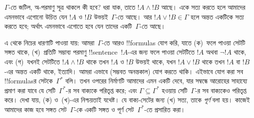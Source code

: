 \documentclass[../../../include/open-logic-section]{subfiles}
\begin{document}
$\Gamma$-তে জটিল, অ-পরমাণু সূত্র থাকলে কী হবে? ধরা যাক, তাতে $!A
\land !B$ আছে। একে সত্য করতে হলে আমাদের এমনভাবে এগোনো উচিত যেন $!A$ ও
$!B$ উভয়ই~$\Gamma$-তে আছে। আর $!A \lor !B \in \Gamma$ হলে অন্তত
একটিকে সত্য করতে হবে; অর্থাৎ এমনভাবে এগোতে হবে যেন তাদের একটি~$\Gamma$-তে
আছে।

এ থেকে নিচের ধারণাটি পাওয়া যায়: আমরা~$\Gamma$-তে আরও !!{formula}s যোগ
করি, যাতে (ক)~ফলে পাওয়া সেটটি সঙ্গত থাকে, (খ)~প্রতিটি সম্ভাব্য পরমাণু
!!{sentence}~$!A$-এর জন্য ফলে পাওয়া সেটটিতে $!A$ অথবা $\lnot !A$
থাকে, এবং (গ)~যখনই সেটটিতে $!A \land !B$ থাকে তখন $!A$ ও $!B$ উভয়ই
থাকে, যখন $!A \lor !B$ থাকে তখন $!A$ বা $!B$-এর অন্তত একটি থাকে,
ইত্যাদি। আমরা এভাবে (সম্ভবত অনন্তকাল) যোগ করতে থাকি। এইভাবে যোগ করা সব
!!{formula}sর সেটকে~$\Gamma^*$ বলি। তখন ওপরের নির্মাণটি আমাদের এমন একটি
দেবে, যার সম্বন্ধে আরোহের সাহায্যে প্রমাণ করা যাবে যে সেটি~$\Gamma^*$-র
সব বাক্যকে পরিতৃপ্ত করে; এবং $\Gamma \subseteq \Gamma^*$ হওয়ায়
সেটি~$\Gamma$-র সব বাক্যকেও পরিতৃপ্ত করে। দেখা যায়, (ক) ও~(খ)-এর
নিশ্চয়তাই যথেষ্ট। যে বাক্য-সেটের জন্য (খ) সত্য, তাকে \emph{পূর্ণ} বলা
হয়। কাজেই আমাদের কাজ হবে সঙ্গত সেট~$\Gamma$-কে একটি সঙ্গত ও পূর্ণ
সেট~$\Gamma^*$-তে প্রসারিত করা।
\end{document}
